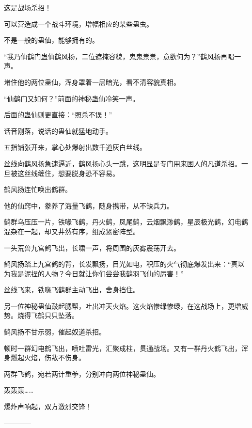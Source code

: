 \begin{this_body}
这是战场杀招！

可以营造成一个战斗环境，增幅相应的某些蛊虫。

不是一般的蛊仙，能够拥有的。

“我乃仙鹤门蛊仙鹤风扬，二位遮掩容貌，鬼鬼祟祟，意欲何为？”鹤风扬再喝一声。

堵住他的两位蛊仙，浑身罩着一层暗光，看不清容貌真相。

“仙鹤门又如何？”前面的神秘蛊仙冷笑一声。

后面的蛊仙则更直接：“照杀不误！”

话音刚落，说话的蛊仙就猛地动手。

五指铺张开来，掌心处爆射出数千道灰白丝线。

丝线向鹤风扬急速逼近，鹤风扬心头一跳，这明显是专门用来困人的凡道杀招。一旦被这丝线缠住，想要脱身恐不容易。

鹤风扬连忙唤出鹤群。

他的仙窍中，豢养了海量飞鹤，随身携带，从不缺兵力。

鹤群乌压压一片，铁喙飞鹤，丹火鹤，凤尾鹤，云烟飘渺鹤，星辰极光鹤，幻电鹤混杂在一起，却又井然有序，组成紧密阵型。

一头荒兽九宫鹤飞出，长啸一声，将周围的灰雾震荡开去。

鹤风扬踏上九宫鹤的背，长发飘扬，目光如电，积压的火气彻底爆发出来：“真以为我是泥捏的人物？今日就让你们尝尝我鹤羽飞仙的厉害！”

丝线飞来，铁喙飞鹤群主动飞出，舍身挡住。

另一位神秘蛊仙鼓起腮帮，吐出冲天火焰。这火焰惨绿惨绿，在这战场上，更增威势。烧得飞鹤只只坠落。

鹤风扬不甘示弱，催起奴道杀招。

顿时一群幻电鹤飞出，喷吐雷光，汇聚成柱，贯通战场。又有一群丹火鹤飞出，浑身燃起火焰，伤敌不伤身。

两群飞鹤，宛若两计重拳，分别冲向两位神秘蛊仙。

轰轰轰……

爆炸声响起，双方激烈交锋！

------------

\end{this_body}

